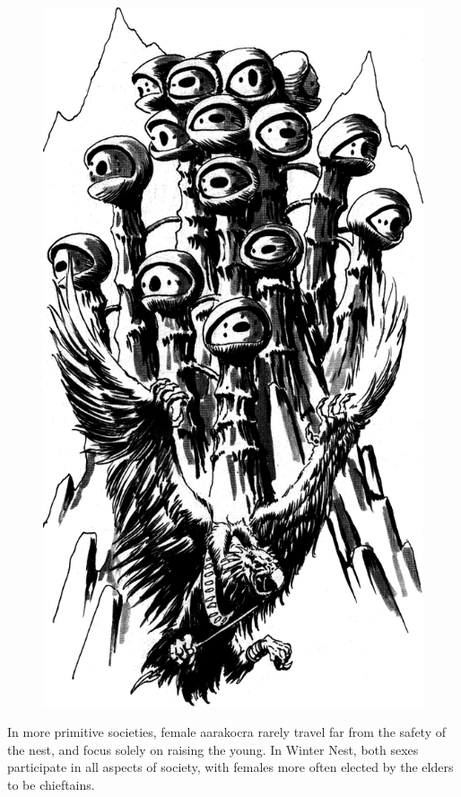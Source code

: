 \begin{figure}[t!]
\centering
\includegraphics[width=\columnwidth]{images/aarakocra-1.png}
\WOTC
\end{figure}

In more primitive societies, female aarakocra rarely travel far from the safety of the nest, and focus solely on raising the young. In Winter Nest, both sexes participate in all aspects of society, with females more often elected by the elders to be chieftains.

